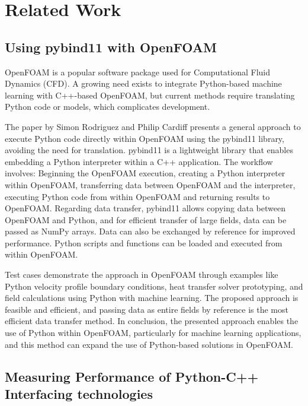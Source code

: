 \chapter{Related Work}\label{chapter:Related Work}

\section{Using pybind11 with OpenFOAM}\label{sec:using-pybind11-in-openfoam} 

OpenFOAM is a popular software package used for Computational Fluid Dynamics (CFD). A growing need exists to integrate Python-based machine learning with C++-based OpenFOAM, but current methods require translating Python code or models, which complicates development. \cite{rw-openfoam-website}

The paper by Simon Rodriguez and Philip Cardiff presents a general approach to execute Python code directly within OpenFOAM using the pybind11 library, avoiding the need for translation. pybind11 is a lightweight library that enables embedding a Python interpreter within a C++ application. The workflow involves: Beginning the OpenFOAM execution, creating a Python interpreter within OpenFOAM, transferring data between OpenFOAM and the interpreter, executing Python code from within OpenFOAM and returning results to OpenFOAM. Regarding data transfer, pybind11 allows copying data between OpenFOAM and Python, and for efficient transfer of large fields, data can be passed as NumPy arrays. Data can also be exchanged by reference for improved performance. Python scripts and functions can be loaded and executed from within OpenFOAM. \cite{rw-openfoam}

Test cases demonstrate the approach in OpenFOAM through examples like Python velocity profile boundary conditions, heat transfer solver prototyping, and field calculations using Python with machine learning. The proposed approach is feasible and efficient, and passing data as entire fields by reference is the most efficient data transfer method. In conclusion, the presented approach enables the use of Python within OpenFOAM, particularly for machine learning applications, and this method can expand the use of Python-based solutions in OpenFOAM. \cite{rw-openfoam}

\section{Measuring Performance of Python-C++ Interfacing technologies}

